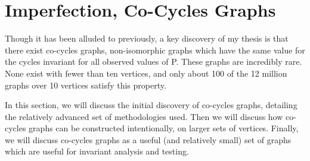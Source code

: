 %
%
%


\section{Imperfection, Co-Cycles Graphs}

Though it has been alluded to previously, a key discovery of my thesis is that there exist co-cycles graphs, non-isomorphic graphs which have the same value for the cycles invariant for all observed values of P.
These graphs are incredibly rare.
None exist with fewer than ten vertices, and only about 100 of the 12 million graphs over 10 vertices satisfy this property.

In this section, we will discuss the initial discovery of co-cycles graphs, detailing the relatively advanced set of methodologies used.
Then we will discuss how co-cycles graphs can be constructed intentionally, on larger sets of vertices.
Finally, we will discuss co-cycles graphs as a useful (and relatively small) set of graphs which are useful for invariant analysis and testing.

